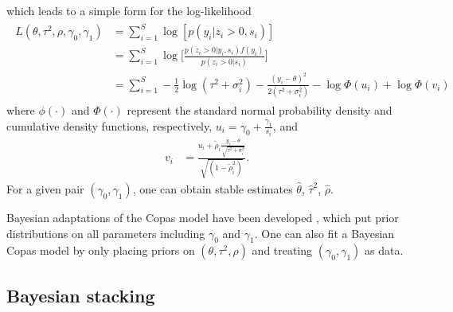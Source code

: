 \documentclass[12pt]{article}   	%
\numberwithin{equation}{section}
\begin{document}
which leads to a simple form for the log-likelihood 
\begin{align}
\begin{split}
L(\theta, \tau^2, \rho, \gamma_0, \gamma_1) &= \sum_{i = 1} ^ S \log[p(y_i \vert z_i > 0, s_i)] \\
& = \sum_{i = 1} ^ S \log \Bigg[ \frac{p(z_i > 0 \vert y_i, s_i) f(y_i)}{p(z_i > 0 \vert s_i)} \Bigg] \\
& = \sum_{i = 1} ^ S -\frac{1}{2} \log(\tau^2 + \sigma_i^2) - \frac{(y_i - \theta)^2}{2(\tau^2 + \sigma_i^2)} - \log \Phi(u_i) + \log \Phi(v_i) \label{eq:loglik}
\end{split}
\end{align}
where $\phi(\cdot)$ and $\Phi(\cdot)$ represent the standard normal probability density and cumulative density functions, respectively, $u_i = \gamma_0 + \frac{\gamma_1}{s_i}$, and 
\begin{align}
v_i &= \frac{u_i + \tilde{\rho}_i \frac{y_i - \theta}{\sqrt{\tau^2 + \sigma_i^2}}}{\sqrt{(1 - \tilde{\rho}_i^2)}}.
\end{align}
For a given pair $(\gamma_0, \gamma_1)$, one can obtain stable estimates $\hat{\theta}$, $\hat{\tau}^2$, $\hat{\rho}$. 

Bayesian adaptations of the Copas model have been developed \citep{mavridis2013copas, bai2020}, which put prior distributions on all parameters including $\gamma_0$ and $\gamma_1$. One can also fit a Bayesian Copas model by only placing priors on $(\theta, \tau^2, \rho)$ and treating $(\gamma_0, \gamma_1)$ as data. 

\subsection{Bayesian stacking} \label{sec:stacking}
\end{document}
